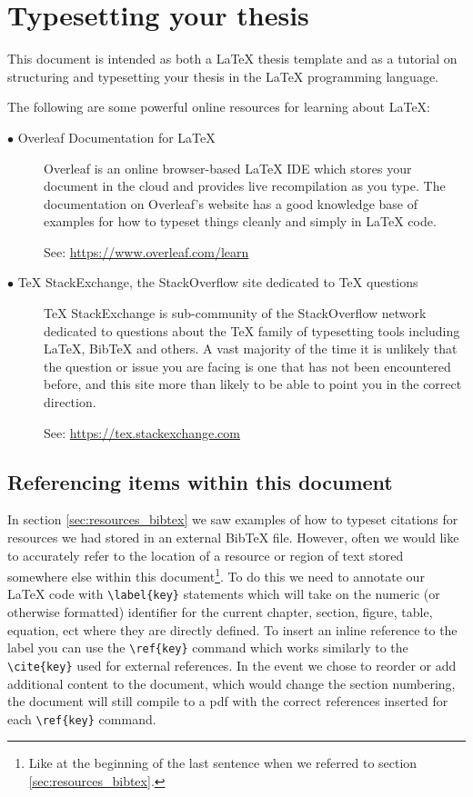 \chapter{Typesetting your thesis}
	\label{chap:typesetting}
	
	This document is intended as both a LaTeX thesis template and as a tutorial on structuring and typesetting your thesis in the LaTeX programming language.
	
	The following are some powerful online resources for learning about LaTeX:
	
	\begin{description}	
			
		\item[$\bullet$ Overleaf Documentation for LaTeX]\hfill
		
		Overleaf \cite{overleafdocs} is an online browser-based LaTeX IDE which stores your document in the cloud and provides live recompilation as you type. The documentation on Overleaf's website has a good knowledge base of examples for how to typeset things cleanly and simply in LaTeX code. 
		
		\noindent See: {\small \url{https://www.overleaf.com/learn}}
		
		\item[$\bullet$ TeX StackExchange, the StackOverflow site dedicated to TeX questions]\hfill
		
		TeX StackExchange \cite{texstackexchange} is sub-community of the StackOverflow network dedicated to questions about the TeX family of typesetting tools including LaTeX, BibTeX and others. A vast majority of the time it is unlikely that the question or issue you are facing is one that has not been encountered before, and this site more than likely to be able to point you in the correct direction. 
		
		\noindent See: {\small \url{https://tex.stackexchange.com}}
		
	\end{description}
	
	\section{Referencing items within this document}
		In section \ref{sec:resources_bibtex} we saw examples of how to typeset citations for resources we had stored in an external BibTeX file. However, often we would like to accurately refer to the location of a resource or region of text stored somewhere else within this document\footnote{Like at the beginning of the last sentence when we referred to section \ref{sec:resources_bibtex}.}. To do this we need to annotate our LaTeX code with \lstinline|\label{key}| statements which will take on the numeric (or otherwise formatted) identifier for the current chapter, section, figure, table, equation, ect where they are directly defined. To insert an inline reference to the label you can use the \lstinline|\ref{key}| command which works similarly to the \lstinline|\cite{key}| used for external references. In the event we chose to reorder or add additional content to the document, which would change the section numbering, the document will still compile to a pdf with the correct references inserted for each \lstinline|\ref{key}| command.
		
